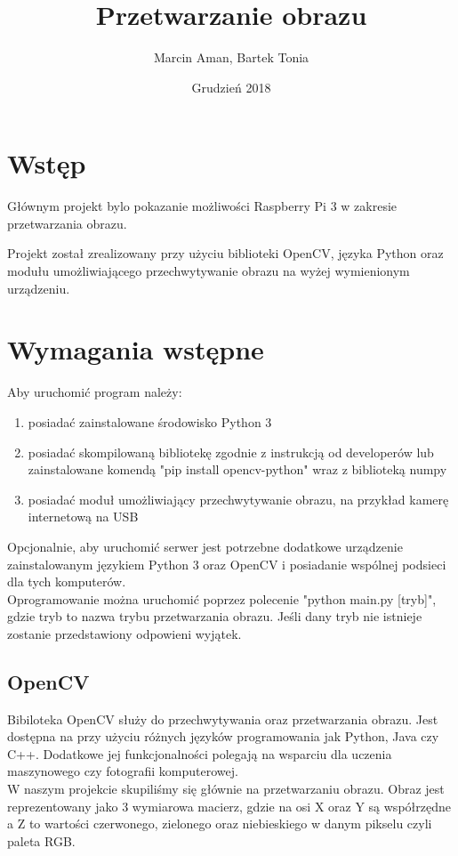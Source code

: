 \documentclass{article}
\title{Przetwarzanie obrazu}
\author{Marcin Aman, Bartek Tonia}
\date{Grudzień 2018}
\begin{document}
\maketitle

\section{Wstęp}
Głównym projekt bylo pokazanie możliwości Raspberry Pi 3 w zakresie przetwarzania obrazu.

Projekt został zrealizowany przy użyciu biblioteki OpenCV, języka Python oraz modułu umożliwiającego przechwytywanie obrazu na wyżej wymienionym urządzeniu.

\section{Wymagania wstępne}
Aby uruchomić program należy:
\begin{enumerate}[I]
    \item posiadać zainstalowane środowisko Python 3
    \item posiadać skompilowaną bibliotekę zgodnie z instrukcją od developerów lub zainstalowane komendą "pip install opencv-python" wraz z biblioteką numpy
    \item posiadać moduł umożliwiający przechwytywanie obrazu, na przykład kamerę internetową na USB
\end{enumerate}
Opcjonalnie, aby uruchomić serwer jest potrzebne dodatkowe urządzenie zainstalowanym językiem Python 3 oraz OpenCV i posiadanie wspólnej podsieci dla tych komputerów.
\\
Oprogramowanie można uruchomić poprzez polecenie "python main.py [tryb]", gdzie tryb to nazwa trybu przetwarzania obrazu. Jeśli dany tryb nie istnieje zostanie przedstawiony odpowieni wyjątek.

\subsection{OpenCV}
Bibiloteka OpenCV służy do przechwytywania oraz przetwarzania obrazu. Jest dostępna na przy użyciu różnych języków programowania jak Python, Java czy C++. Dodatkowe jej funkcjonalności polegają na wsparciu dla uczenia maszynowego czy fotografii komputerowej.\\

W naszym projekcie skupiliśmy się głównie na przetwarzaniu obrazu. Obraz jest reprezentowany jako 3 wymiarowa macierz, gdzie na osi X oraz Y są współrzędne a Z to wartości czerwonego, zielonego oraz niebieskiego w danym pikselu czyli paleta RGB.
\end{document}
